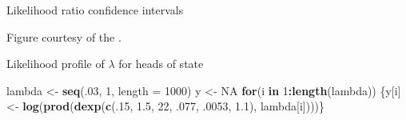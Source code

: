 \documentclass[ignorenonframetext,]{beamer}
\newenvironment{Shaded}{\begin{snugshade}}{\end{snugshade}}
\newcommand{\KeywordTok}[1]{\textcolor[rgb]{0.13,0.29,0.53}{\textbf{#1}}}
\newcommand{\DataTypeTok}[1]{\textcolor[rgb]{0.13,0.29,0.53}{#1}}
\newcommand{\DecValTok}[1]{\textcolor[rgb]{0.00,0.00,0.81}{#1}}
\newcommand{\FloatTok}[1]{\textcolor[rgb]{0.00,0.00,0.81}{#1}}
\newcommand{\StringTok}[1]{\textcolor[rgb]{0.31,0.60,0.02}{#1}}
\newcommand{\OtherTok}[1]{\textcolor[rgb]{0.56,0.35,0.01}{#1}}
\newcommand{\ControlFlowTok}[1]{\textcolor[rgb]{0.13,0.29,0.53}{\textbf{#1}}}
\newcommand{\OperatorTok}[1]{\textcolor[rgb]{0.81,0.36,0.00}{\textbf{#1}}}
\newcommand{\NormalTok}[1]{#1}
\begin{document}
\begin{frame}{Likelihood ratio confidence intervals}

\begin{center}

\end{center}

Figure courtesy of the
\href{https://www.unc.edu/courses/2010fall/ecol/563/001/docs/lectures/lecture8.htm\#constructing}{}.

\end{frame}

\begin{frame}[fragile]{Likelihood profile of \(\lambda\) for heads of
state}

\begin{center}

\end{center}

\tiny

\begin{Shaded}
\begin{Highlighting}[]
\NormalTok{lambda <-}\StringTok{ }\KeywordTok{seq}\NormalTok{(.}\DecValTok{03}\NormalTok{, }\DecValTok{1}\NormalTok{, }\DataTypeTok{length =} \DecValTok{1000}\NormalTok{)}
\NormalTok{y <-}\StringTok{ }\OtherTok{NA}
\ControlFlowTok{for}\NormalTok{(i }\ControlFlowTok{in} \DecValTok{1}\OperatorTok{:}\KeywordTok{length}\NormalTok{(lambda)) \{y[i] <-}\StringTok{ }\KeywordTok{log}\NormalTok{(}\KeywordTok{prod}\NormalTok{(}\KeywordTok{dexp}\NormalTok{(}\KeywordTok{c}\NormalTok{(.}\DecValTok{15}\NormalTok{, }\FloatTok{1.5}\NormalTok{, }\DecValTok{22}\NormalTok{, .}\DecValTok{077}\NormalTok{, .}\DecValTok{0053}\NormalTok{, }\FloatTok{1.1}\NormalTok{), lambda[i])))\}}
\end{Highlighting}
\end{Shaded}

\end{frame}
\end{document}

